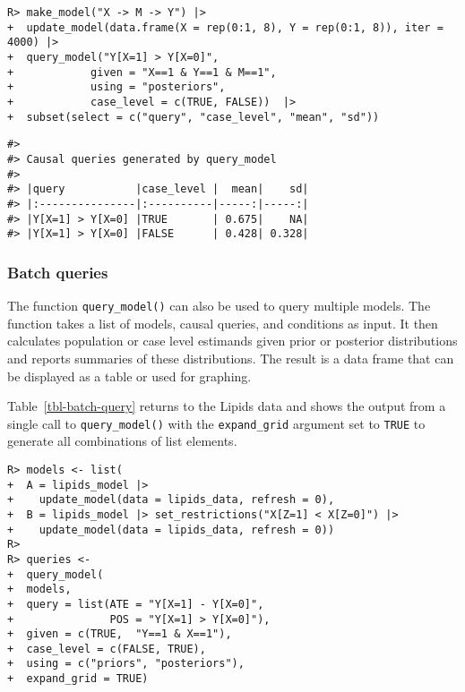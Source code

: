 \documentclass[
  11pt,
  article]{jss}
\begin{document}
\begin{verbatim}
R> make_model("X -> M -> Y") |>
+  update_model(data.frame(X = rep(0:1, 8), Y = rep(0:1, 8)), iter = 4000) |>
+  query_model("Y[X=1] > Y[X=0]", 
+            given = "X==1 & Y==1 & M==1", 
+            using = "posteriors",
+            case_level = c(TRUE, FALSE))  |> 
+  subset(select = c("query", "case_level", "mean", "sd"))
\end{verbatim}

\begin{verbatim}
#> 
#> Causal queries generated by query_model
#> 
#> |query           |case_level |  mean|    sd|
#> |:---------------|:----------|-----:|-----:|
#> |Y[X=1] > Y[X=0] |TRUE       | 0.675|    NA|
#> |Y[X=1] > Y[X=0] |FALSE      | 0.428| 0.328|
\end{verbatim}

\subsubsection{Batch queries}\label{batch-queries}

The function \texttt{query\_model()} can also be used to query multiple
models. The function takes a list of models, causal queries, and
conditions as input. It then calculates population or case level
estimands given prior or posterior distributions and reports summaries
of these distributions. The result is a data frame that can be displayed
as a table or used for graphing.

Table~\ref{tbl-batch-query} returns to the Lipids data and shows the
output from a single call to \texttt{query\_model()} with the
\texttt{expand\_grid} argument set to \texttt{TRUE} to generate all
combinations of list elements.

\begin{verbatim}
R> models <- list(
+  A = lipids_model |> 
+    update_model(data = lipids_data, refresh = 0),
+  B = lipids_model |> set_restrictions("X[Z=1] < X[Z=0]") |>
+    update_model(data = lipids_data, refresh = 0))
R> 
R> queries <- 
+  query_model(
+  models,
+  query = list(ATE = "Y[X=1] - Y[X=0]", 
+               POS = "Y[X=1] > Y[X=0]"),
+  given = c(TRUE,  "Y==1 & X==1"),
+  case_level = c(FALSE, TRUE),
+  using = c("priors", "posteriors"),
+  expand_grid = TRUE)
\end{verbatim}
\end{document}

